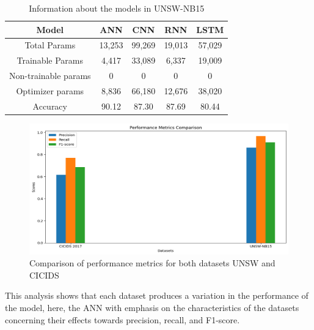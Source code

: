 \documentclass{llncs}
\begin{document}
\begin{table}[H]
\caption{Information about the models in UNSW-NB15}
\centering
\begin{tabular}{|c|c|c|c|c|}
        \hline
        Model & ANN & CNN & RNN & LSTM \\ \hline
        Total Params & 13,253 & 99,269 & 19,013 & 57,029 \\ \hline
        Trainable Params & 4,417 & 33,089 & 6,337 & 19,009 \\ \hline
        Non-trainable params & 0 & 0 & 0 & 0 \\ \hline
        Optimizer params & 8,836 & 66,180 & 12,676 & 38,020 \\ \hline
        Accuracy & 90.12 & 87.30 & 87.69 & 80.44 \\ \hline
\end{tabular}
\label{tab 3}
\end{table}
\begin{figure}[H]
    \centering
    \includegraphics[width=0.75\linewidth]{5.png}
    \caption{Comparison of performance metrics for both datasets UNSW and CICIDS}
    \label{fig:enter-label}
\end{figure}




This analysis shows that each dataset produces a variation in the performance of the model, here, the ANN with emphasis on the characteristics of the datasets concerning their effects towards precision, recall, and F1-score.
\end{document}
